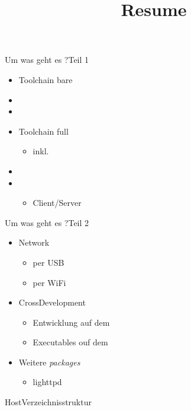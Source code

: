 \documentclass{beamer}
\begin{document}
\title[Resume]{Resume}

\frame{\titlepage}

\begin{frame}{Um was geht es ?}{\linux Teil 1}
 \begin{itemize}
  \item Toolchain bare 
  \item {}
  \item {}
  \item Toolchain full
  \begin{itemize}
   \item inkl. \cpp
  \end{itemize}
  \item {}
  \item {}
  \begin{itemize}
   \item Client/Server
  \end{itemize}
 \end{itemize}
 
\end{frame}

\begin{frame}{Um was geht es ?}{\linux Teil 2}
 \begin{itemize}
  \item Network
  \begin{itemize}
   \item per USB
   \item per WiFi
  \end{itemize}
  \item CrossDevelopment
  \begin{itemize}
   \item Entwicklung auf dem \host
   \item Executables ouf dem \targetS
  \end{itemize}
  \item Weitere {\em packages}
  \begin{itemize}
   \item lighttpd
  \end{itemize}
 \end{itemize}
\end{frame}

\begin{frame}{Host}{Verzeichnisstruktur}
\end{frame}
\end{document}
